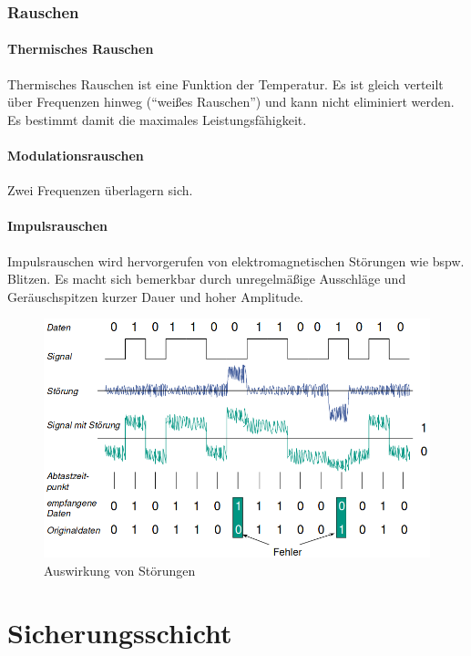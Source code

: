 \documentclass[a4paper, 14pt]{article}
\begin{document}
	\subsubsection{Rauschen}

	\paragraph{Thermisches Rauschen}

	Thermisches Rauschen ist eine Funktion der Temperatur.
	Es ist gleich verteilt über Frequenzen hinweg (\enquote{weißes Rauschen}) und kann nicht eliminiert werden.
	Es bestimmt damit die maximales Leistungsfähigkeit.

	\paragraph{Modulationsrauschen}

	Zwei Frequenzen überlagern sich.

	\paragraph{Impulsrauschen}

	Impulsrauschen wird hervorgerufen von elektromagnetischen Störungen wie bspw. Blitzen.
	Es macht sich bemerkbar durch unregelmäßige Ausschläge und Geräuschspitzen kurzer Dauer und hoher Amplitude.

	\begin{figure}
		\includegraphics[width=\textwidth]{images/03-error.png}
		\caption{Auswirkung von Störungen}
	\end{figure}

	\section{Sicherungsschicht}
\end{document}
